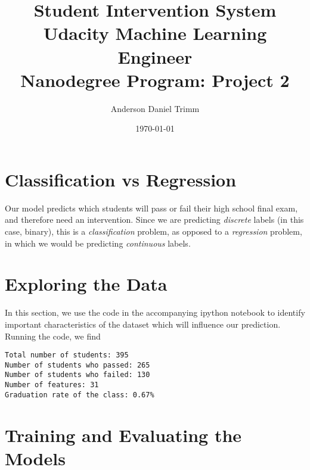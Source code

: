 \documentclass[12 pt]{article}
\numberwithin{equation}{section}
\begin{document}
\title{Student Intervention System \\ \footnotesize{Udacity Machine Learning Engineer \\ Nanodegree Program: Project 2}}
\author{Anderson Daniel Trimm}
\date{\today}
\maketitle

\section{Classification vs Regression}
Our model predicts which students will pass or fail their high school final exam, and therefore need an intervention. Since we are predicting \emph{discrete} labels (in this case, binary), this is a \emph{classification} problem, as opposed to a \emph{regression} problem, in which we would be predicting \emph{continuous} labels.
\section{Exploring the Data}
In this section, we use the code in the accompanying ipython notebook to identify important characteristics of the dataset which will influence our prediction. Running the code, we find

\begin{verbatim}	
Total number of students: 395
Number of students who passed: 265
Number of students who failed: 130
Number of features: 31
Graduation rate of the class: 0.67%
\end{verbatim}

\section{Training and Evaluating the Models}
\end{document}
